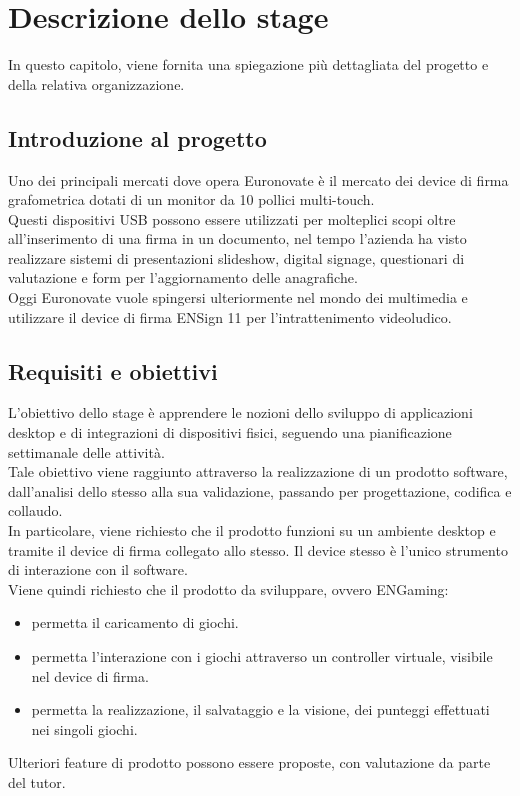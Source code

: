 \chapter{Descrizione dello stage}
\label{cap:descrizione-stage}

In questo capitolo, viene fornita una spiegazione più dettagliata del progetto e della relativa organizzazione.

\section{Introduzione al progetto}

Uno dei principali mercati dove opera Euronovate è il mercato dei device di firma grafometrica
dotati di un monitor da 10 pollici multi-touch.\\ Questi dispositivi USB possono essere utilizzati
per molteplici scopi oltre all'inserimento di una firma in un documento, nel tempo l'azienda ha visto
realizzare sistemi di presentazioni slideshow, digital signage, questionari di valutazione e form
per l'aggiornamento delle anagrafiche.\\ Oggi Euronovate vuole spingersi ulteriormente nel mondo dei
multimedia e utilizzare il device di firma ENSign 11 per l'intrattenimento videoludico.\\

\section{Requisiti e obiettivi}

L'obiettivo dello stage è apprendere le nozioni dello sviluppo di applicazioni desktop e di integrazioni di dispositivi fisici, seguendo una pianificazione
settimanale delle attività.\\
Tale obiettivo viene raggiunto attraverso la realizzazione di un prodotto software, dall'analisi dello stesso alla sua validazione, passando per progettazione, codifica e collaudo.\\
In particolare, viene richiesto che il prodotto funzioni su un ambiente desktop e tramite il device di firma collegato allo stesso. Il device stesso è l'unico strumento di interazione con il software.\\
Viene quindi richiesto che il prodotto da sviluppare, ovvero ENGaming:
\begin{itemize}
    \item permetta il caricamento di giochi.
    \item permetta l'interazione con i giochi attraverso un controller virtuale, visibile nel device di firma.
    \item permetta la realizzazione, il salvataggio e la visione, dei punteggi effettuati nei singoli giochi.
\end{itemize}
Ulteriori feature di prodotto possono essere proposte, con valutazione da parte del tutor.


